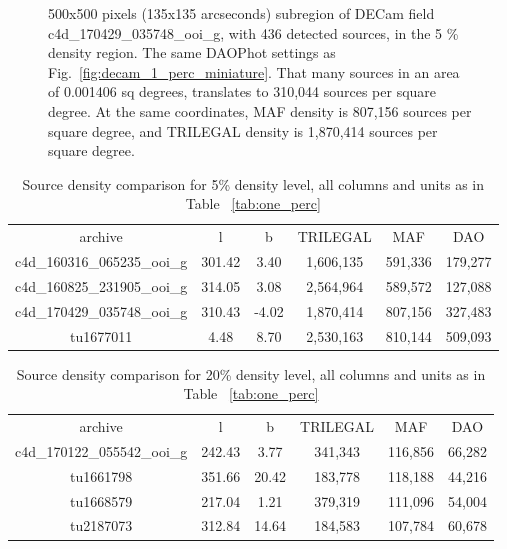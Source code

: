 \documentclass[DM,lsstdraft,toc,usenatbib]{lsstdoc}
\begin{document}
\begin{figure}
\begin{minipage}[t]{0.5\linewidth}
\caption{500x500 pixels (135x135 arcseconds) subregion of DECam field c4d\_170429\_035748\_ooi\_g,  with 436  detected sources, in the 5 \% density region. The same DAOPhot settings as Fig.~\ref{fig:decam_1_perc_miniature}. That many sources in an area of 0.001406 sq degrees,  translates to 310,044 sources per square degree. At the same coordinates, MAF density is 807,156 sources per square degree, and TRILEGAL density is 1,870,414 sources per square degree. }
\label{fig:decam_5_perc_miniature}
\end{minipage}%
\end{figure}





\begin{table}
\begin{tabular}{cccccc}
archive & l & b & TRILEGAL & MAF & DAO \\
c4d\_160316\_065235\_ooi\_g & 301.42 & 3.40 & 1,606,135 & 591,336 & 179,277 \\
c4d\_160825\_231905\_ooi\_g & 314.05 & 3.08 & 2,564,964 & 589,572 & 127,088 \\
c4d\_170429\_035748\_ooi\_g & 310.43 & -4.02 & 1,870,414 & 807,156 & 327,483 \\
tu1677011 & 4.48 & 8.70 & 2,530,163 & 810,144 & 509,093 \\
\end{tabular}
\caption{Source density comparison for 5\% density level, all columns and units as in Table ~\ref{tab:one_perc}}
\label{tab:five_perc}
\end{table}



\begin{table}
\begin{tabular}{cccccc}
archive & l & b & TRILEGAL & MAF & DAO \\
c4d\_170122\_055542\_ooi\_g & 242.43 & 3.77 & 341,343 & 116,856 & 66,282 \\
tu1661798 & 351.66 & 20.42 & 183,778 & 118,188 & 44,216 \\
tu1668579 & 217.04 & 1.21 & 379,319 & 111,096 & 54,004 \\
tu2187073 & 312.84 & 14.64 & 184,583 & 107,784 & 60,678 \\
\end{tabular}
\caption{Source density comparison for 20\% density level, all columns and units as in Table ~\ref{tab:one_perc}}
\label{tab:twenty_perc}
\end{table}
\end{document}
